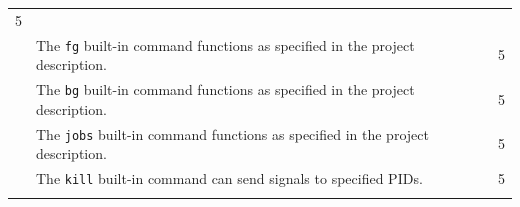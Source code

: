 \documentclass[10pt]{article}
\newcommand{\checkbox}[0]{\makebox[0pt][l]{$\square$}\raisebox{.15ex}{\hspace{0.1em}}}
\begin{document}
\begin{longtable}[c]{@{}lll@{}}
\begin{minipage}[t]{0.11\columnwidth}
5
\end{minipage}
\\\addlinespace\hline\addlinespace
\begin{minipage}[t]{0.06\columnwidth}\raggedright
\end{minipage} \checkbox & \begin{minipage}[t]{0.74\columnwidth}\raggedright
The \texttt{fg} built-in command functions as specified in the project
description.
\end{minipage} & \begin{minipage}[t]{0.11\columnwidth}\raggedright
5
\end{minipage}
\\\addlinespace\hline\addlinespace
\begin{minipage}[t]{0.06\columnwidth}\raggedright
\end{minipage} \checkbox & \begin{minipage}[t]{0.74\columnwidth}\raggedright
The \texttt{bg} built-in command functions as specified in the project
description.
\end{minipage} & \begin{minipage}[t]{0.11\columnwidth}\raggedright
5
\end{minipage}
\\\addlinespace\hline\addlinespace
\begin{minipage}[t]{0.06\columnwidth}\raggedright
\end{minipage} \checkbox & \begin{minipage}[t]{0.74\columnwidth}\raggedright
The \texttt{jobs} built-in command functions as specified in the project
description.
\end{minipage} & \begin{minipage}[t]{0.11\columnwidth}\raggedright
5
\end{minipage}
\\\addlinespace\hline\addlinespace
\begin{minipage}[t]{0.06\columnwidth}\raggedright
\end{minipage} \checkbox & \begin{minipage}[t]{0.74\columnwidth}\raggedright
The \texttt{kill} built-in command can send signals to specified PIDs.
\end{minipage} & \begin{minipage}[t]{0.11\columnwidth}\raggedright
5
\end{minipage}
\\\addlinespace\hline\addlinespace
\begin{minipage}[t]{0.06\columnwidth}\raggedright

\end{minipage}
\end{longtable}
\end{document}
